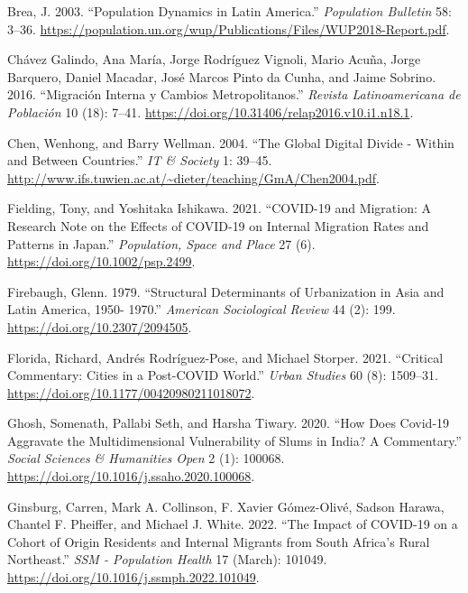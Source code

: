 \documentclass[11pt,letterpaper]{article}
\newlength{\cslhangindent}
\newlength{\cslentryspacingunit} %
\newenvironment{CSLReferences}[2] %
 {%
  \setlength{\parindent}{0pt}
  \ifodd #1
  \let\oldpar\par
  \def\par{\hangindent=\cslhangindent\oldpar}
  \fi
  \setlength{\parskip}{#2\cslentryspacingunit}
 }%
 {}
\begin{document}
\begin{CSLReferences}{1}{0}
Brea, J. 2003. {``Population Dynamics in Latin America.''}
\emph{Population Bulletin} 58: 3--36.
\url{https://population.un.org/wup/Publications/Files/WUP2018-Report.pdf}.

Chávez Galindo, Ana María, Jorge Rodríguez Vignoli, Mario Acuña, Jorge
Barquero, Daniel Macadar, José Marcos Pinto da Cunha, and Jaime Sobrino.
2016. {``Migración Interna y Cambios Metropolitanos.''} \emph{Revista
Latinoamericana de Población} 10 (18): 7--41.
\url{https://doi.org/10.31406/relap2016.v10.i1.n18.1}.

Chen, Wenhong, and Barry Wellman. 2004. {``The Global Digital Divide -
Within and Between Countries.''} \emph{IT \& Society} 1: 39--45.
\url{http://www.ifs.tuwien.ac.at/~dieter/teaching/GmA/Chen2004.pdf}.

Fielding, Tony, and Yoshitaka Ishikawa. 2021. {``COVID{-}19 and
Migration: A Research Note on the Effects of COVID{-}19 on Internal
Migration Rates and Patterns in Japan.''} \emph{Population, Space and
Place} 27 (6). \url{https://doi.org/10.1002/psp.2499}.

Firebaugh, Glenn. 1979. {``Structural Determinants of Urbanization in
Asia and Latin America, 1950- 1970.''} \emph{American Sociological
Review} 44 (2): 199. \url{https://doi.org/10.2307/2094505}.

Florida, Richard, Andrés Rodríguez-Pose, and Michael Storper. 2021.
{``Critical Commentary: Cities in a Post-COVID World.''} \emph{Urban
Studies} 60 (8): 1509--31.
\url{https://doi.org/10.1177/00420980211018072}.

Ghosh, Somenath, Pallabi Seth, and Harsha Tiwary. 2020. {``How Does
Covid-19 Aggravate the Multidimensional Vulnerability of Slums in India?
A Commentary.''} \emph{Social Sciences \& Humanities Open} 2 (1):
100068. \url{https://doi.org/10.1016/j.ssaho.2020.100068}.

Ginsburg, Carren, Mark A. Collinson, F. Xavier Gómez-Olivé, Sadson
Harawa, Chantel F. Pheiffer, and Michael J. White. 2022. {``The Impact
of COVID-19 on a Cohort of Origin Residents and Internal Migrants from
South Africa's Rural Northeast.''} \emph{SSM - Population Health} 17
(March): 101049. \url{https://doi.org/10.1016/j.ssmph.2022.101049}.


\end{CSLReferences}
\end{document}
